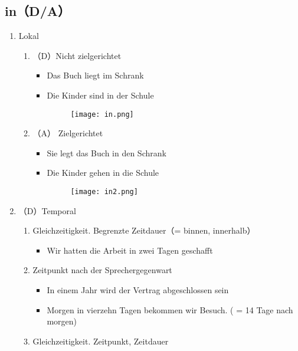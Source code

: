\documentclass[UTF8]{report}
\begin{document}
\subsection{in（D/A）}
\begin{enumerate}
    \item Lokal
    \begin{enumerate}
        \item （D）Nicht zielgerichtet
        \begin{itemize}
            \item Das Buch liegt im Schrank
            \item Die Kinder sind in der Schule
            \begin{figure}[H]
                \centering
                \texttt{[image: in.png]}
            \end{figure}
        \end{itemize}
        \item（A） Zielgerichtet
        \begin{itemize}
            \item Sie legt das Buch in den Schrank
            \item Die Kinder gehen in die Schule
            \begin{figure}[H]
                \centering
                \texttt{[image: in2.png]}
            \end{figure}
        \end{itemize}
    \end{enumerate}
    \item （D）Temporal
    \begin{enumerate}
        \item Gleichzeitigkeit. Begrenzte Zeitdauer（= binnen, innerhalb）
        \begin{itemize}
            \item Wir hatten die Arbeit in zwei Tagen geschafft
        \end{itemize}
        \item Zeitpunkt nach der Sprechergegenwart
        \begin{itemize}
            \item In einem Jahr wird der Vertrag abgeschlossen sein
            \item Morgen in vierzehn Tagen bekommen wir Besuch. ( = 14 Tage nach morgen)
        \end{itemize}
        \item Gleichzeitigkeit. Zeitpunkt, Zeitdauer

\end{enumerate}
\end{enumerate}
\end{document}
